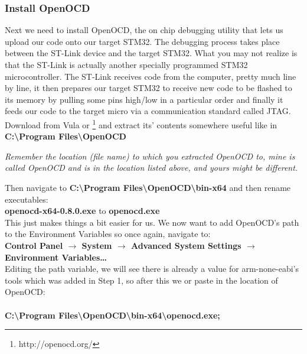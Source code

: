 \subsubsection{Install OpenOCD}
Next we need to install OpenOCD, the on chip debugging utility that lets us upload our code onto our target STM32. The debugging process takes place between the ST-Link device and the target STM32. What you may not realize is that the ST-Link is actually another specially programmed STM32 microcontroller. The  ST-Link receives code from the computer, pretty much line by line, it then prepares our target STM32 to receive new code to be flashed to its memory by pulling some pins high/low in a particular order and finally it feeds our code to the target micro via a communication standard called JTAG.
\\
Download {\color{Blue}\underline{}} from Vula or {\color{Blue}\underline{}}\footnote{http://openocd.org/} and extract its' contents somewhere useful like in \textbf{\color{Aquamarine} C:\textbackslash Program Files\textbackslash OpenOCD}
\par
\emph{\color{Gray} Remember the location (file name) to which you extracted OpenOCD to, mine is called OpenOCD and is in the location listed above, and yours might be different.}
\par
Then navigate to \textbf{\color{Aquamarine}C:\textbackslash Program Files\textbackslash OpenOCD\textbackslash bin-x64} and then rename executables:
\\
\textbf{\color{Orange}openocd-x64-0.8.0.exe} to \textbf{\color{Orange}openocd.exe}
\\
This just makes things a bit easier for us. We now want to add OpenOCD’s path to the Environment Variables so once again, navigate to:\\
\textbf{\color{Green} Control Panel $\rightarrow$ System $\rightarrow$ Advanced System Settings $\rightarrow$ Environment Variables\ldots}
\\
Editing the path variable, we will see there is already a value for arm-none-eabi’s tools which was added in Step 1, so after this we \underline{} or paste in the location of OpenOCD:
\\
\underline{}
\\
\textbf{\color{Aquamarine} C:\textbackslash Program Files\textbackslash OpenOCD\textbackslash bin-x64\textbackslash openocd.exe;}
